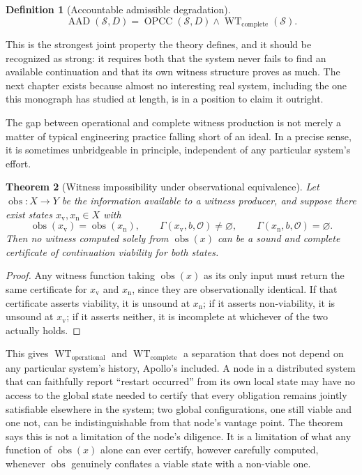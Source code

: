 \documentclass[11pt]{report}
\newtheorem{definition}{Definition}[chapter]
\newtheorem{theorem}[definition]{Theorem}
\begin{document}
\begin{definition}[Accountable admissible degradation]
\[
\operatorname{AAD}(\mathcal S, D) = \operatorname{OPCC}(\mathcal S, D) \land \operatorname{WT}_{\mathrm{complete}}(\mathcal S).
\]
\end{definition}

This is the strongest joint property the theory defines, and it should be recognized as strong: it requires both that the system never fails to find an available continuation and that its own witness structure proves as much. The next chapter exists because almost no interesting real system, including the one this monograph has studied at length, is in a position to claim it outright.

The gap between operational and complete witness production is not merely a matter of typical engineering practice falling short of an ideal. In a precise sense, it is sometimes unbridgeable in principle, independent of any particular system's effort.

\begin{theorem}[Witness impossibility under observational equivalence]
Let $\operatorname{obs} : X \to Y$ be the information available to a witness producer, and suppose there exist states $x_{\mathrm v}, x_{\mathrm n} \in X$ with
\[
\operatorname{obs}(x_{\mathrm v}) = \operatorname{obs}(x_{\mathrm n}), \qquad \Gamma(x_{\mathrm v}, b, \mathcal O) \ne \varnothing, \qquad \Gamma(x_{\mathrm n}, b, \mathcal O) = \varnothing.
\]
Then no witness computed solely from $\operatorname{obs}(x)$ can be a sound and complete certificate of continuation viability for both states.
\end{theorem}
\begin{proof}
Any witness function taking $\operatorname{obs}(x)$ as its only input must return the same certificate for $x_{\mathrm v}$ and $x_{\mathrm n}$, since they are observationally identical. If that certificate asserts viability, it is unsound at $x_{\mathrm n}$; if it asserts non-viability, it is unsound at $x_{\mathrm v}$; if it asserts neither, it is incomplete at whichever of the two actually holds.
\end{proof}

This gives $\operatorname{WT}_{\mathrm{operational}}$ and $\operatorname{WT}_{\mathrm{complete}}$ a separation that does not depend on any particular system's history, Apollo's included. A node in a distributed system that can faithfully report ``restart occurred'' from its own local state may have no access to the global state needed to certify that every obligation remains jointly satisfiable elsewhere in the system; two global configurations, one still viable and one not, can be indistinguishable from that node's vantage point. The theorem says this is not a limitation of the node's diligence. It is a limitation of what any function of $\operatorname{obs}(x)$ alone can ever certify, however carefully computed, whenever $\operatorname{obs}$ genuinely conflates a viable state with a non-viable one.
\end{document}
